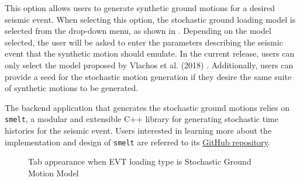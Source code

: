 This option allows users to generate synthetic ground motions for a
desired seismic event. When selecting this option, the stochastic
ground loading model is selected from the drop-down menu, as shown
in . Depending on the model selected,
the user will be asked to enter the parameters describing the seismic
event that the synthetic motion should emulate. In the current
release, users can only select the model proposed by Vlachos et
al. (2018) \cite{vlachos2018predictive}. Additionally, users can
provide a seed for the stochastic motion generation if they desire the
same suite of synthetic motions to be generated.

The backend application that generates the stochastic ground motions
relies on \texttt{smelt}, a modular and extensible C++ library for
generating stochastic time histories for the seismic event. Users
interested in learning more about the implementation and design of
\texttt{smelt} are referred to its
\href{https://github.com/shellshocked2003/Stochastic-Loading-Module}{GitHub repository}.

\begin{figure}[!htbp]
  \caption{Tab appearance when EVT loading type is Stochastic Ground
  Motion Model}
  \label{fig:stochastic_loading}
\end{figure}
